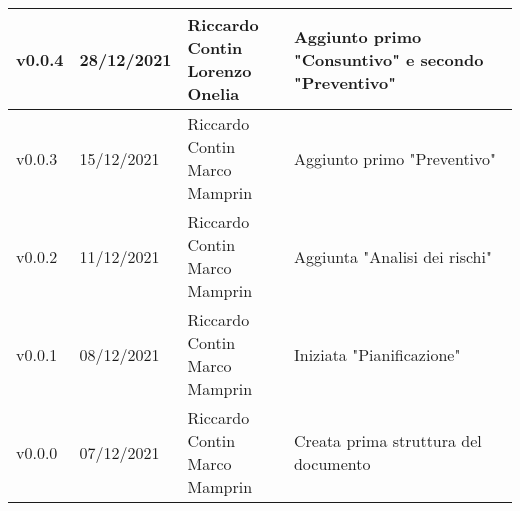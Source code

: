 \begin{center}
\begin{longtable}{|p{2cm}|p{2cm}|p{4cm}|p{5cm}|}
    v0.0.4            & 28/12/2021    & \aCapo{Riccardo Contin\\Lorenzo Onelia}               & Aggiunto primo "Consuntivo" e secondo "Preventivo" \\ \hline
    v0.0.3            & 15/12/2021    & \aCapo{Riccardo Contin\\Marco Mamprin}                & Aggiunto primo "Preventivo" \\ \hline
    v0.0.2            & 11/12/2021    & \aCapo{Riccardo Contin\\Marco Mamprin}                & Aggiunta "Analisi dei rischi" \\ \hline
    v0.0.1            & 08/12/2021    & \aCapo{Riccardo Contin\\Marco Mamprin}                & Iniziata "Pianificazione" \\ \hline
    v0.0.0            & 07/12/2021    & \aCapo{Riccardo Contin\\Marco Mamprin}                & Creata prima struttura del documento \\ \hline
  \end{longtable}
\end{center}
